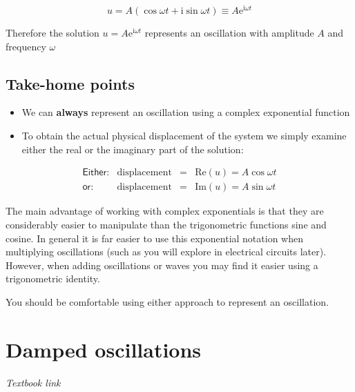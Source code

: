 \documentclass[
]{book}
\providecommand{\tightlist}{%
  \setlength{\itemsep}{0pt}\setlength{\parskip}{0pt}}
\begin{document}
\begin{equation}
u = A (\cos \omega t + \mathrm{i} \sin \omega t) \equiv A \mathrm{e}^{\mathrm{i}\omega t}
\label{eq:ch3-demoivreoscillation1}
\end{equation}

Therefore the solution \(u = A\mathrm{e}^{\mathrm{i}\omega t}\) represents an oscillation with amplitude \(A\) and frequency \(\omega\)

\hypertarget{take-home-points}{%
\section{Take-home points}\label{take-home-points}}

\begin{itemize}
\tightlist
\item
  We can \textbf{always} represent an oscillation using a complex exponential function
\item
  To obtain the actual physical displacement of the system we simply examine either the real or the imaginary part of the solution:
\end{itemize}

\begin{equation}
\begin{array}{lrcl}
\textsf{Either:} & \textrm{displacement} &=& \mathrm{Re}(u) = A \cos \omega t \\
\textsf{or:} & \textrm{displacement} &=& \mathrm{Im}(u) = A \sin \omega t
\end{array}
\end{equation}

The main advantage of working with complex exponentials is that they are considerably easier to manipulate than the trigonometric functions sine and cosine. In general it is far easier to use this exponential notation when multiplying oscillations (such as you will explore in electrical circuits later). However, when adding oscillations or waves you may find it easier using a trigonometric identity.

You should be comfortable using either approach to represent an oscillation.

\hypertarget{sec-ch4-dampedoscillations}{%
\chapter{Damped oscillations}\label{sec-ch4-dampedoscillations}}

\emph{Textbook link}
\end{document}
